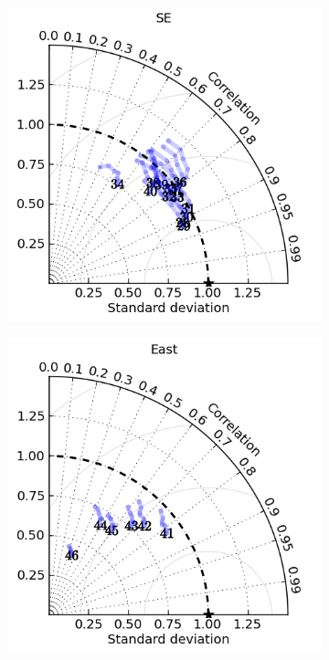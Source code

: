 \begin{figure}[!hbt]
\begin{subfigure}{0.30\textwidth}
        \caption{}
    \end{subfigure}
    \begin{subfigure}{0.30\textwidth}
        \includegraphics[width=\textwidth]{figures/plots/taylor_diag_res_SE.png}
        \caption{}
    \end{subfigure}
    \begin{subfigure}{0.30\textwidth}
        \includegraphics[width=\textwidth]{figures/plots/taylor_diag_res_East.png}

\end{subfigure}
\end{figure}
